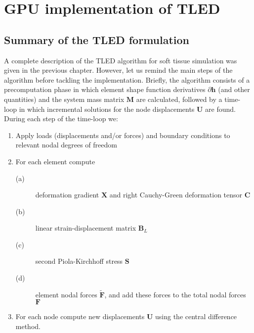 \chapter{GPU implementation of TLED}
\label{chap6}
\begin{shortAbstract}
\end{shortAbstract}

\section{Summary of the TLED formulation}
A complete description of the TLED algorithm for soft tissue simulation was given in the previous chapter. However, let us remind the main steps of the algorithm before tackling the implementation. Briefly, the algorithm consists of a precomputation phase in which element shape function derivatives $ \partial \mathbf{h} $ (and other quantities) and the system mass matrix $ \mathbf{M} $ are calculated, followed by a time-loop in which incremental solutions for the node displacements $ \mathbf{U} $ are found. During each step of the time-loop we:
\begin{enumerate}
\item Apply loads (displacements and/or forces) and boundary conditions to relevant nodal degrees of freedom
\item For each element compute
\begin{description}
\item[(a)] deformation gradient $ \mathbf{X} $ and right Cauchy-Green deformation tensor $ \mathbf{C} $
\item[(b)] linear strain-displacement matrix $ \mathbf{B}_L $
\item[(c)] second Piola-Kirchhoff stress $ \mathbf{S} $
\item[(d)] element nodal forces $ \mathbf{\tilde{F}} $, and add these forces to the total nodal forces $ \mathbf{F} $
\end{description}
\item For each node compute new displacements $ \mathbf{U} $ using the central difference method.
\end{enumerate}

\bigskip

